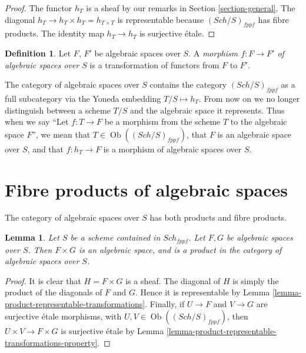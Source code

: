 \documentclass{stacks-project}
\theoremstyle{plain}
\newtheorem{lemma}[subsection]{Lemma}
\theoremstyle{definition}
\newtheorem{definition}[subsection]{Definition}
\theoremstyle{remark}
\numberwithin{equation}{subsection}
\def\Sch{\mathit{Sch}}
\def\Ob{\mathop{\mathrm{Ob}}\nolimits}
\begin{document}
\begin{proof}
The functor $h_T$ is a sheaf by our remarks in Section \ref{section-general}.
The diagonal $h_T \to h_T \times h_T = h_{T \times T}$ is
representable because $(\Sch/S)_{fppf}$ has fibre products.
The identity map $h_T \to h_T$ is surjective \'etale.
\end{proof}

\begin{definition}
\label{definition-morphism-algebraic-spaces}
Let $F$, $F'$ be algebraic spaces over $S$.
A {\it morphism $f : F \to F'$ of algebraic spaces over $S$}
is a transformation of functors from $F$ to $F'$.
\end{definition}

\noindent
The category of algebraic spaces over $S$ contains the category
$(\Sch/S)_{fppf}$ as a full subcategory via the
Yoneda embedding $T/S \mapsto h_T$. From now on we no longer distinguish
between a scheme $T/S$ and the algebraic space it represents.
Thus when we say ``Let $f : T \to F$ be a morphism from the scheme
$T$ to the algebraic space $F$'', we mean that
$T \in \Ob((\Sch/S)_{fppf})$, that $F$ is an
algebraic space over $S$, and that $f : h_T \to F$ is a morphism
of algebraic spaces over $S$.






\section{Fibre products of algebraic spaces}
\label{section-fibre-products}

\noindent
The category of algebraic spaces over $S$ has both products and
fibre products.

\begin{lemma}
\label{lemma-product-spaces}
Let $S$ be a scheme contained in $\Sch_{fppf}$.
Let $F, G$ be algebraic spaces over $S$.
Then $F \times G$ is an algebraic space, and is a product
in the category of algebraic spaces over $S$.
\end{lemma}

\begin{proof}
It is clear that $H = F \times G$ is a sheaf.
The diagonal of $H$ is simply the product of the
diagonals of $F$ and $G$. Hence it is representable by
Lemma \ref{lemma-product-representable-transformations}.
Finally, if $U \to F$ and $V \to G$ are surjective
\'etale morphisms, with $U, V \in \Ob((\Sch/S)_{fppf})$,
then $U \times V \to F \times G$ is surjective \'etale
by Lemma \ref{lemma-product-representable-transformations-property}.
\end{proof}
\end{document}
